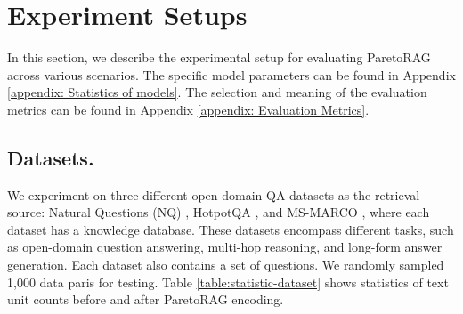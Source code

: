 \section{Experiment Setups}

In this section, we describe the experimental setup for evaluating ParetoRAG across various scenarios. The specific model parameters can be found in Appendix \ref{appendix: Statistics of models}. The selection and meaning of the evaluation metrics can be found in Appendix \ref{appendix: Evaluation Metrics}.

\subsection{Datasets.} 



We experiment on three different open-domain QA datasets as the retrieval source: Natural Questions (NQ) \cite{kwiatkowskiNaturalQuestionsBenchmark2019}, HotpotQA \cite{yangHotpotQADatasetDiverse2018}, and MS-MARCO \cite{nguyen2016ms}, where each dataset has a knowledge database. 
These datasets encompass different tasks, such as open-domain question answering, multi-hop reasoning, and long-form answer generation. 
Each dataset also contains a set of questions. We randomly sampled 1,000 data paris for testing. Table \ref{table:statistic-dataset} shows statistics of text unit counts before and after ParetoRAG encoding.



